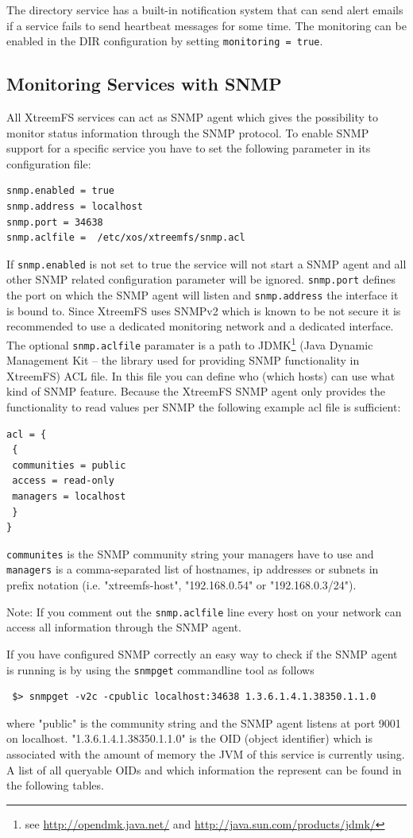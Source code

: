 \documentclass[a4paper,10pt]{book}
\begin{document}
The directory service has a built-in notification system that can send alert emails if a service fails to send heartbeat messages for some time. The monitoring can be enabled in the DIR configuration by setting \texttt{monitoring = true}.

\subsection{Monitoring Services with SNMP}
\label{sec:snmpmonitoring}
All XtreemFS services can act as SNMP agent which gives the possibility to monitor status information through the SNMP protocol. To enable SNMP support for a specific service you have to set the following parameter in its configuration file: 

\begin{verbatim}
snmp.enabled = true
snmp.address = localhost
snmp.port = 34638
snmp.aclfile =  /etc/xos/xtreemfs/snmp.acl
\end{verbatim}

If \texttt{snmp.enabled} is not set to true the service will not start a SNMP agent and all other SNMP related configuration parameter will be ignored.  \texttt{snmp.port} defines the port on which the SNMP agent will listen and \texttt{snmp.address} the interface it is bound to. Since XtreemFS uses SNMPv2 which is known to be not secure it is recommended to use a dedicated monitoring network and a dedicated interface. The optional \texttt{snmp.aclfile} paramater is a path to JDMK\footnote{see \url{http://opendmk.java.net/} and \url{http://java.sun.com/products/jdmk/}} (Java Dynamic Management Kit -- the library used for providing SNMP functionality in XtreemFS) ACL file. In this file you can define who (which hosts) can use what kind of SNMP feature. Because the XtreemFS SNMP agent only provides the functionality to read values per SNMP the following example acl file is sufficient:
\begin{verbatim}
acl = {
 {
 communities = public
 access = read-only
 managers = localhost
 }
}
\end{verbatim}
\texttt{communites} is the SNMP community string your managers have to use and \texttt{managers} is a comma-separated list of hostnames, ip addresses or subnets in prefix notation (i.e. "xtreemfs-host", "192.168.0.54" or "192.168.0.3/24").

Note: If you comment out the \texttt{snmp.aclfile} line every host on your network can access all information through the SNMP agent.

If you have configured SNMP correctly an easy way to check if the SNMP agent is running is by using the \texttt{snmpget} commandline tool as follows
\begin{verbatim}
 $> snmpget -v2c -cpublic localhost:34638 1.3.6.1.4.1.38350.1.1.0 
\end{verbatim}
where "public" is the community string and the SNMP agent listens at port 9001 on localhost. "1.3.6.1.4.1.38350.1.1.0" is the OID (object identifier) which is associated with the amount of memory the JVM of this service is currently using. A list of all queryable OIDs and which information the represent can be found in the following tables.
\end{document}
